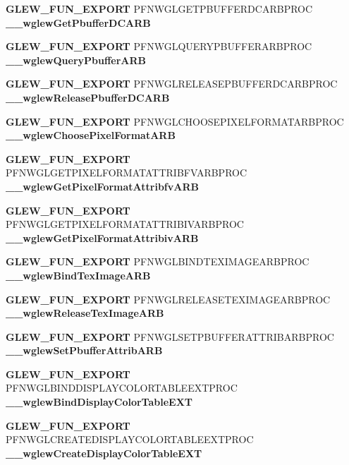 \begin{DoxyCompactItemize}
\item 
{\bf G\+L\+E\+W\+\_\+\+F\+U\+N\+\_\+\+E\+X\+P\+O\+RT} P\+F\+N\+W\+G\+L\+G\+E\+T\+P\+B\+U\+F\+F\+E\+R\+D\+C\+A\+R\+B\+P\+R\+OC {\bf \+\_\+\+\_\+wglew\+Get\+Pbuffer\+D\+C\+A\+RB}
\item 
{\bf G\+L\+E\+W\+\_\+\+F\+U\+N\+\_\+\+E\+X\+P\+O\+RT} P\+F\+N\+W\+G\+L\+Q\+U\+E\+R\+Y\+P\+B\+U\+F\+F\+E\+R\+A\+R\+B\+P\+R\+OC {\bf \+\_\+\+\_\+wglew\+Query\+Pbuffer\+A\+RB}
\item 
{\bf G\+L\+E\+W\+\_\+\+F\+U\+N\+\_\+\+E\+X\+P\+O\+RT} P\+F\+N\+W\+G\+L\+R\+E\+L\+E\+A\+S\+E\+P\+B\+U\+F\+F\+E\+R\+D\+C\+A\+R\+B\+P\+R\+OC {\bf \+\_\+\+\_\+wglew\+Release\+Pbuffer\+D\+C\+A\+RB}
\item 
{\bf G\+L\+E\+W\+\_\+\+F\+U\+N\+\_\+\+E\+X\+P\+O\+RT} P\+F\+N\+W\+G\+L\+C\+H\+O\+O\+S\+E\+P\+I\+X\+E\+L\+F\+O\+R\+M\+A\+T\+A\+R\+B\+P\+R\+OC {\bf \+\_\+\+\_\+wglew\+Choose\+Pixel\+Format\+A\+RB}
\item 
{\bf G\+L\+E\+W\+\_\+\+F\+U\+N\+\_\+\+E\+X\+P\+O\+RT} P\+F\+N\+W\+G\+L\+G\+E\+T\+P\+I\+X\+E\+L\+F\+O\+R\+M\+A\+T\+A\+T\+T\+R\+I\+B\+F\+V\+A\+R\+B\+P\+R\+OC {\bf \+\_\+\+\_\+wglew\+Get\+Pixel\+Format\+Attribfv\+A\+RB}
\item 
{\bf G\+L\+E\+W\+\_\+\+F\+U\+N\+\_\+\+E\+X\+P\+O\+RT} P\+F\+N\+W\+G\+L\+G\+E\+T\+P\+I\+X\+E\+L\+F\+O\+R\+M\+A\+T\+A\+T\+T\+R\+I\+B\+I\+V\+A\+R\+B\+P\+R\+OC {\bf \+\_\+\+\_\+wglew\+Get\+Pixel\+Format\+Attribiv\+A\+RB}
\item 
{\bf G\+L\+E\+W\+\_\+\+F\+U\+N\+\_\+\+E\+X\+P\+O\+RT} P\+F\+N\+W\+G\+L\+B\+I\+N\+D\+T\+E\+X\+I\+M\+A\+G\+E\+A\+R\+B\+P\+R\+OC {\bf \+\_\+\+\_\+wglew\+Bind\+Tex\+Image\+A\+RB}
\item 
{\bf G\+L\+E\+W\+\_\+\+F\+U\+N\+\_\+\+E\+X\+P\+O\+RT} P\+F\+N\+W\+G\+L\+R\+E\+L\+E\+A\+S\+E\+T\+E\+X\+I\+M\+A\+G\+E\+A\+R\+B\+P\+R\+OC {\bf \+\_\+\+\_\+wglew\+Release\+Tex\+Image\+A\+RB}
\item 
{\bf G\+L\+E\+W\+\_\+\+F\+U\+N\+\_\+\+E\+X\+P\+O\+RT} P\+F\+N\+W\+G\+L\+S\+E\+T\+P\+B\+U\+F\+F\+E\+R\+A\+T\+T\+R\+I\+B\+A\+R\+B\+P\+R\+OC {\bf \+\_\+\+\_\+wglew\+Set\+Pbuffer\+Attrib\+A\+RB}
\item 
{\bf G\+L\+E\+W\+\_\+\+F\+U\+N\+\_\+\+E\+X\+P\+O\+RT} P\+F\+N\+W\+G\+L\+B\+I\+N\+D\+D\+I\+S\+P\+L\+A\+Y\+C\+O\+L\+O\+R\+T\+A\+B\+L\+E\+E\+X\+T\+P\+R\+OC {\bf \+\_\+\+\_\+wglew\+Bind\+Display\+Color\+Table\+E\+XT}
\item 
{\bf G\+L\+E\+W\+\_\+\+F\+U\+N\+\_\+\+E\+X\+P\+O\+RT} P\+F\+N\+W\+G\+L\+C\+R\+E\+A\+T\+E\+D\+I\+S\+P\+L\+A\+Y\+C\+O\+L\+O\+R\+T\+A\+B\+L\+E\+E\+X\+T\+P\+R\+OC {\bf \+\_\+\+\_\+wglew\+Create\+Display\+Color\+Table\+E\+XT}

\end{DoxyCompactItemize}
